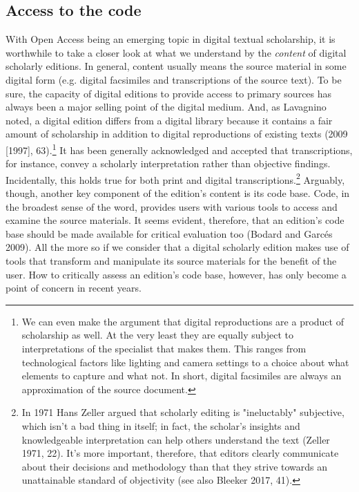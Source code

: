 \begin{paper}
\subsection{Access to the code}

With Open Access being an emerging topic in digital textual scholarship,
it is worthwhile to take a closer look at what we understand by the
\emph{content} of digital scholarly editions. In general, content
usually means the source material in some digital form (e.g. digital
facsimiles and transcriptions of the source text). To be sure, the
capacity of digital editions to provide access to primary sources has
always been a major selling point of the digital medium. And, as
Lavagnino noted, a digital edition differs from a digital library
because it contains a fair amount of scholarship in addition to digital
reproductions of existing texts (2009 {[}1997{]}, 63).\footnote{We can
  even make the argument that digital reproductions are a product of
  scholarship as well. At the very least they are equally subject to
  interpretations of the specialist that makes them. This ranges from
  technological factors like lighting and camera settings to a choice
  about what elements to capture and what not. In short, digital
  facsimiles are always an approximation of the source document.} It has
been generally acknowledged and accepted that transcriptions, for
instance, convey a scholarly interpretation rather than objective
findings. Incidentally, this holds true for both print and digital
transcriptions.\footnote{In 1971 Hans Zeller argued that scholarly
  editing is "ineluctably" subjective, which isn't a bad thing in
  itself; in fact, the scholar's insights and knowledgeable
  interpretation can help others understand the text (Zeller 1971, 22).
  It's more important, therefore, that editors clearly communicate about
  their decisions and methodology than that they strive towards an
  unattainable standard of objectivity (see also Bleeker 2017, 41).}
Arguably, though, another key component of the edition's content is its
code base. Code, in the broadest sense of the word, provides users with
various tools to access and examine the source materials. It seems
evident, therefore, that an edition's code base should be made available
for critical evaluation too (Bodard and Garcés 2009). All the more so if
we consider that a digital scholarly edition makes use of tools that
transform and manipulate its source materials for the benefit of the
user. How to critically assess an edition's code base, however, has only
become a point of concern in recent years.


\end{paper}
